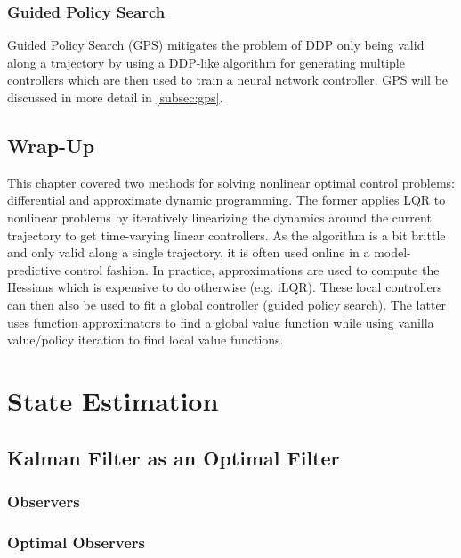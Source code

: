 		\subsection{Guided Policy Search}
			Guided Policy Search (GPS) mitigates the problem of DDP only being valid along a trajectory by using a DDP-like algorithm for generating multiple controllers which are then used to train a neural network controller. GPS will be discussed in more detail in \autoref{subsec:gps}.

	\section{Wrap-Up}
		This chapter covered two methods for solving nonlinear optimal control problems: differential and approximate dynamic programming. The former applies LQR to nonlinear problems by iteratively linearizing the dynamics around the current trajectory to get time-varying linear controllers. As the algorithm is a bit brittle and only valid along a single trajectory, it is often used online in a model-predictive control fashion. In practice, approximations are used to compute the Hessians which is expensive to do otherwise (e.g. iLQR). These local controllers can then also be used to fit a global controller (guided policy search). The latter uses function approximators to find a global value function while using vanilla value/policy iteration to find local value functions.

\chapter{State Estimation} %
	\label{c:stateEstimation}


	\section{Kalman Filter as an Optimal Filter} %

		\subsection{Observers} %

		\subsection{Optimal Observers} %

